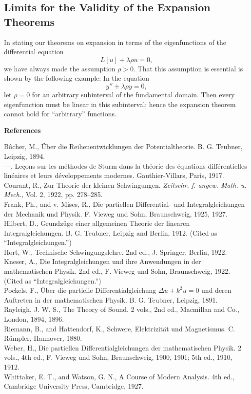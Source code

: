 \subsection{Limits for the Validity of the Expansion Theorems}
In stating our theorems on expansion in terms of the eigenfunctions of the differential equation
\[
L[u]+\lambda\rho u=0,
\]
we have always made the assumption $\rho>0$. That this assumption is essential is shown by the following example: In the equation
\[
y''+\lambda\rho y=0,
\]
let $\rho=0$ for an arbitrary subinterval of the fundamental domain. Then every eigenfunction must be linear in this subinterval; hence the expansion theorem cannot hold for ``arbitrary'' functions.

\begin{center}
\textbf{References}
\end{center}
\begin{flushleft}
B\^ocher, M., \"Uber die Reihenentwicklungen der Potentialtheorie. B. G. Teubner, Leipzig, 1894.\\
---, Le\c{c}ons sur les m\'ethodes de Sturm dans la th\'eorie des \'equations diff\'erentielles lin\'eaires et leurs d\'eveloppements modernes. Gauthier-Villars, Paris, 1917.\\
Courant, R., Zur Theorie der kleinen Schwingungen. \emph{Zeitschr. f. angew. Math. u. Mech.}, Vol. 2, 1922, pp. 278--285.\\
Frank, Ph., and v. Mises, R., Die partiellen Differential- und Integralgleichungen der Mechanik und Physik. F. Vieweg und Sohn, Braunschweig, 1925, 1927.\\
Hilbert, D., Grundz\"uge einer allgemeinen Theorie der linearen Integralgleichungen. B. G. Teubner, Leipzig and Berlin, 1912. (Cited as ``Integralgleichungen.'')\\
Hort, W., Technische Schwingungslehre. 2nd ed., J. Springer, Berlin, 1922.\\
Kneser, A., Die Integralgleichungen und ihre Anwendungen in der mathematischen Physik. 2nd ed., F. Vieweg und Sohn, Braunschweig, 1922. (Cited as ``Integralgleichungen.'')\\
Pockels, F., \"Uber die partielle Differentialgleichung $\Delta u+k^2u=0$ und deren Auftreten in der mathematischen Physik. B. G. Teubner, Leipzig, 1891.\\
Rayleigh, J. W. S., The Theory of Sound. 2 vols., 2nd ed., Macmillan and Co., London, 1894, 1896.\\
Riemann, B., and Hattendorf, K., Schwere, Elektrizit\"at und Magnetismus. C. R\"umpler, Hannover, 1880.\\
Weber, H., Die partiellen Differentialgleichungen der mathematischen Physik. 2 vols., 4th ed., F. Vieweg und Sohn, Braunschweig, 1900, 1901; 5th ed., 1910, 1912.\\
Whittaker, E. T., and Watson, G. N., A Course of Modern Analysis. 4th ed., Cambridge University Press, Cambridge, 1927.
\end{flushleft}
